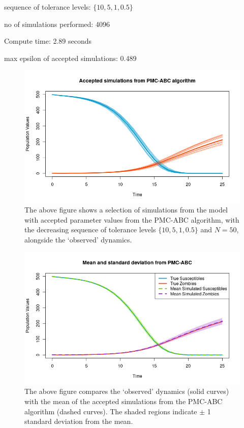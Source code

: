 \documentclass[]{article}
\begin{document}
sequence of tolerance levels: $\{ 10, 5, 1, 0.5\}$

no of simulations performed: 4096

Compute time: 2.89 seconds

max epsilon of accepted simulations: 0.489

\begin{figure}[H]
	\centering
	\includegraphics[width=0.8\linewidth]{../Figures/PMC-ABC_simulations}
	\caption{The above figure shows a selection of simulations from the model with accepted parameter values from the PMC-ABC algorithm, with the decreasing sequence of tolerance levels $\{ 10, 5, 1, 0.5\}$ and $N=50$, alongside the `observed' dynamics.}
	\label{pmc_abc_acc_simulations}
\end{figure}

\begin{figure}[H]
	\centering
	\includegraphics[width=0.8\linewidth]{../Figures/PMC_ABC_sd_bands}
	\caption{The above figure compares the `observed' dynamics (solid curves) with the mean of the accepted simulations from the PMC-ABC algorithm (dashed curves). The shaded regions indicate $\pm$ 1 standard deviation from the mean.}
	\label{pmc_abc_sd}
\end{figure}
\end{document}
